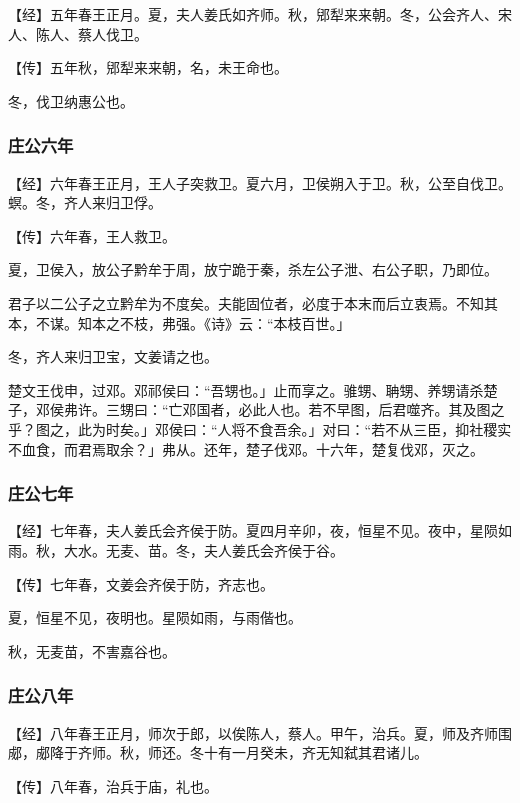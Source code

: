 \documentclass[]{article}
\begin{document}
【经】五年春王正月。夏，夫人姜氏如齐师。秋，郳犁来来朝。冬，公会齐人、宋人、陈人、蔡人伐卫。

【传】五年秋，郳犁来来朝，名，未王命也。

冬，伐卫纳惠公也。

\hypertarget{header-n387}{%
\subsubsection{庄公六年}\label{header-n387}}

【经】六年春王正月，王人子突救卫。夏六月，卫侯朔入于卫。秋，公至自伐卫。螟。冬，齐人来归卫俘。

【传】六年春，王人救卫。

夏，卫侯入，放公子黔牟于周，放宁跪于秦，杀左公子泄、右公子职，乃即位。

君子以二公子之立黔牟为不度矣。夫能固位者，必度于本末而后立衷焉。不知其本，不谋。知本之不枝，弗强。《诗》云：``本枝百世。」

冬，齐人来归卫宝，文姜请之也。

楚文王伐申，过邓。邓祁侯曰：``吾甥也。」止而享之。骓甥、聃甥、养甥请杀楚子，邓侯弗许。三甥曰：``亡邓国者，必此人也。若不早图，后君噬齐。其及图之乎？图之，此为时矣。」邓侯曰：``人将不食吾余。」对曰：``若不从三臣，抑社稷实不血食，而君焉取余？」弗从。还年，楚子伐邓。十六年，楚复伐邓，灭之。

\hypertarget{header-n396}{%
\subsubsection{庄公七年}\label{header-n396}}

【经】七年春，夫人姜氏会齐侯于防。夏四月辛卯，夜，恒星不见。夜中，星陨如雨。秋，大水。无麦、苗。冬，夫人姜氏会齐侯于谷。

【传】七年春，文姜会齐侯于防，齐志也。

夏，恒星不见，夜明也。星陨如雨，与雨偕也。

秋，无麦苗，不害嘉谷也。

\hypertarget{header-n403}{%
\subsubsection{庄公八年}\label{header-n403}}

【经】八年春王正月，师次于郎，以俟陈人，蔡人。甲午，治兵。夏，师及齐师围郕，郕降于齐师。秋，师还。冬十有一月癸未，齐无知弑其君诸儿。

【传】八年春，治兵于庙，礼也。
\end{document}

